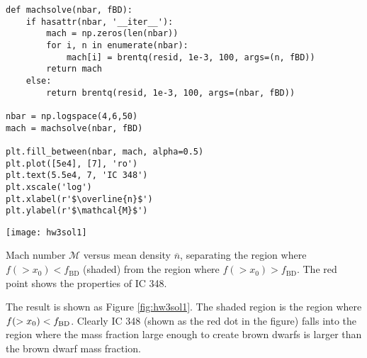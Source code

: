 \begin{enumerate}
\begin{enumerate}
\begin{verbatim}
def machsolve(nbar, fBD):
    if hasattr(nbar, '__iter__'):
        mach = np.zeros(len(nbar))
        for i, n in enumerate(nbar):
            mach[i] = brentq(resid, 1e-3, 100, args=(n, fBD))
        return mach
    else:
        return brentq(resid, 1e-3, 100, args=(nbar, fBD))

nbar = np.logspace(4,6,50)
mach = machsolve(nbar, fBD)

plt.fill_between(nbar, mach, alpha=0.5)
plt.plot([5e4], [7], 'ro')
plt.text(5.5e4, 7, 'IC 348')
plt.xscale('log')
plt.xlabel(r'$\overline{n}$')
plt.ylabel(r'$\mathcal{M}$')
\end{verbatim}
\begin{marginfigure}
\texttt{[image: hw3sol1]}
\caption[Solution to problem set~\thesolutionset, problem~\theenumi\theenumii]{
\label{fig:hw3sol1}
Mach number $\mathcal{M}$ versus mean density $\overline{n}$, separating the region where $f(>x_0) < f_{\mathrm{BD}}$ (shaded) from the region where $f(>x_0) > f_{\mathrm{BD}}$. The red point shows the properties of IC 348.
}
\end{marginfigure}
The result is shown as Figure \ref{fig:hw3sol1}. The shaded region is the region where $f(>x_0)<f_{\rm BD}$. Clearly IC 348 (shown as the red dot in the figure) falls into the region where the mass fraction large enough to create brown dwarfs is larger than the brown dwarf mass fraction.

\end{enumerate}

\end{enumerate}